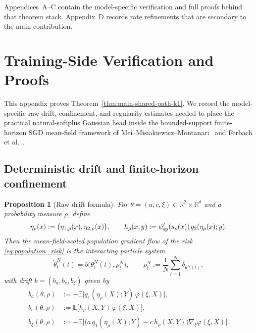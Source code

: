 \documentclass[11pt]{article}
\newtheorem{proposition}[theorem]{Proposition}
\theoremstyle{definition}
\newcommand{\R}{\mathbb{R}}
\newcommand{\E}{\mathbb{E}}
\begin{document}
Appendices~A--C contain the model-specific verification and full proofs behind
that theorem stack. Appendix~D records rate refinements that are secondary to
the main contribution.

\appendix

\section{Training-Side Verification and Proofs}

This appendix proves Theorem~\ref{thm:main-shared-path-k1}. We record the
model-specific raw drift, confinement, and regularity estimates needed to place
the practical natural-softplus Gaussian head inside the bounded-support
finite-horizon SGD mean-field framework of
Mei--Misiakiewicz--Montanari~\cite{MeiMisiakiewiczMontanari2019} and
Ferbach et al.~\cite{Ferbach2024}.

\subsection{Deterministic drift and finite-horizon confinement}

\begin{proposition}[Raw drift formula]
\label{prop:softplus-raw-drift-k1}
For $\theta=(a,c,\xi)\in\R^2\times\R^d$ and a probability measure $\rho$,
define
\[
  \eta_\rho(x)
  :=
  \bigl(\eta_{1,\rho}(x),\eta_{2,\rho}(x)\bigr),
  \qquad
  h_\rho(x,y)
  :=
  \psi_{\rm sp}'(s_\rho(x))\,q_2(\eta_\rho(x);y).
\]
Then the mean-field-scaled population gradient flow of the risk
\eqref{eq:population_risk} is the interacting particle system
\begin{equation}
  \dot\theta_i^N(t)
  =
  b\bigl(\theta_i^N(t),\rho_t^N\bigr),
  \qquad
  \rho_t^N:=\frac1N\sum_{i=1}^N \delta_{\theta_i^N(t)},
  \label{eq:particle-system-k1}
\end{equation}
with drift $b=(b_a,b_c,b_\xi)$ given by
\begin{align}
  b_a(\theta,\rho)
  &:=
  -
  \E\big[q_1(\eta_\rho(X);Y)\,\varphi(\xi,X)\big],
  \label{eq:drift-a-k1}
  \\
  b_c(\theta,\rho)
  &:=
  \E\big[h_\rho(X,Y)\,\varphi(\xi,X)\big],
  \label{eq:drift-c-k1}
  \\
  b_\xi(\theta,\rho)
  &:=
  -
  \E\Big[
    \big(a\,q_1(\eta_\rho(X);Y)-c\,h_\rho(X,Y)\big)\nabla_\xi\varphi(\xi,X)
  \Big].
  \label{eq:drift-xi-k1}
\end{align}
\end{proposition}
\end{document}
